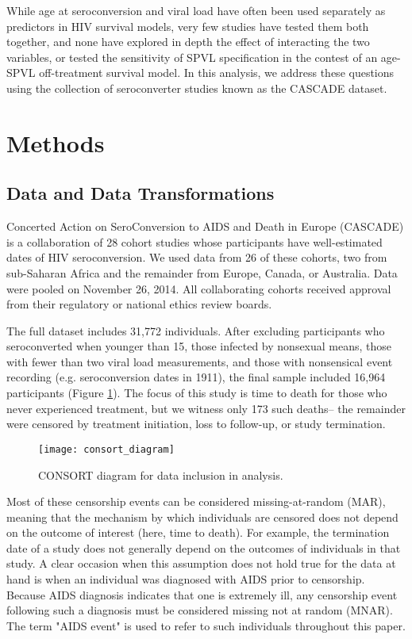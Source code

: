 \documentclass[12pt, titlepage, proquest]{article}
\begin{document}
While age at seroconversion and viral load have often been used separately as predictors in HIV survival models, very few studies \cite{chirouze_viremia_2015,sterling_initial_2001} have tested them both together, and none have explored in depth the effect of interacting the two variables, or tested the sensitivity of SPVL specification in the contest of an age-SPVL off-treatment survival model. In this analysis, we address these questions using the collection of seroconverter studies known as the CASCADE dataset. 

\section{Methods}

\subsection{Data and Data Transformations}
Concerted Action on SeroConversion to AIDS and Death in Europe (CASCADE) is a collaboration of 28 cohort studies whose participants have well-estimated dates of HIV seroconversion. We used data from 26 of these cohorts, two from sub-Saharan Africa and the remainder from Europe, Canada, or Australia.  Data were pooled on November 26, 2014. All collaborating cohorts received approval from their regulatory or national ethics review boards.

The full dataset includes 31,772 individuals. After excluding participants who seroconverted when younger than 15, those infected by nonsexual means, those with fewer than two viral load measurements, and those with nonsensical event recording (e.g. seroconversion dates in 1911), the final sample included 16,964 participants (Figure \ref{consort}). The focus of this study is time to death for those who never experienced treatment, but we witness only 173 such deaths-- the remainder were censored by treatment initiation, loss to follow-up, or study termination.


\begin{figure}
	\caption{CONSORT diagram for data inclusion in analysis.}
	\label{consort}
	\centering
		\texttt{[image: consort\_diagram]}
\end{figure}

Most of these censorship events can be considered missing-at-random (MAR), meaning that the mechanism by which individuals are censored does not depend on the outcome of interest (here, time to death). For example, the termination date of a study does not generally depend on the outcomes of individuals in that study. A clear occasion when this assumption does not hold true for the data at hand is when an individual was diagnosed with AIDS prior to censorship. Because AIDS diagnosis indicates that one is extremely ill, any censorship event following such a diagnosis must be considered missing not at random (MNAR). The term "AIDS event" is used to refer to such individuals throughout this paper.
\end{document}
